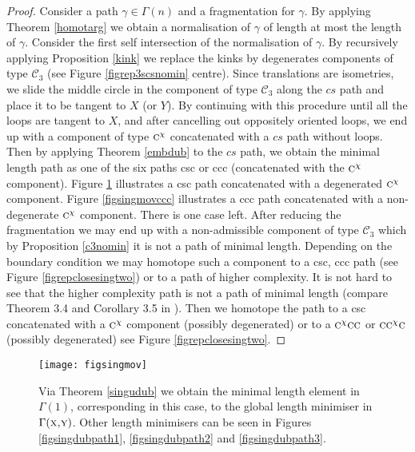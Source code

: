 \documentclass{amsart}
\theoremstyle{definition}
\theoremstyle{remark}
\numberwithin{equation}{section}
\begin{document}
\begin{proof} Consider a path $\gamma \in \Gamma(n)$ and a fragmentation for $\gamma$. By applying Theorem \ref{homotarg} we obtain a normalisation of $\gamma$ of length at most the length of $\gamma$. Consider the first self intersection of the normalisation of $\gamma$. By recursively applying Proposition \ref{kink} we replace the kinks by degenerates components of type ${\mathscr C}_3$ (see Figure \ref{figrep3scsnomin} centre). Since translations are isometries, we slide the middle circle in the component of type ${\mathscr C}_3$ along the $cs$ path and place it to be tangent to $X$ (or $Y$). By continuing with this procedure until all the loops are tangent to $X$, and after cancelling out oppositely oriented loops, we end up with a component of type $\mbox{\sc c}^{\chi}$ concatenated with a $cs$ path without loops. Then by applying Theorem \ref{embdub} to the $cs$ path, we obtain the minimal length path as one of the six paths {\sc csc} or {\sc ccc} (concatenated with the $\mbox{\sc c}^{\chi}$ component). Figure \ref{figsingmov} illustrates a {\sc csc} path concatenated with a degenerated $\mbox{\sc c}^{\chi}$ component. Figure \ref{figsingmovccc} illustrates a {\sc ccc} path concatenated with a non-degenerate $\mbox{\sc c}^{\chi}$ component. There is one case left. After reducing the fragmentation we may end up with a non-admissible component of type ${\mathscr C}_3$ which by Proposition \ref{c3nomin} it is not a path of minimal length. Depending on the boundary condition we may homotope such a component to a {\sc csc}, {\sc ccc} path (see Figure \ref{figrepclosesingtwo}) or to a path of higher complexity. It is not hard to see that the higher complexity path is not a path of minimal length (compare Theorem 3.4 and Corollary 3.5 in \cite{papera}). Then we homotope the path to a {\sc csc} concatenated with a $\mbox{\sc c}^{\chi}$ component (possibly degenerated) or to a $\mbox{\sc c}^\chi \mbox{\sc c}\mbox{\sc c}$ or $\mbox{\sc c} \mbox{\sc c}^{\chi}\mbox{\sc c}$ (possibly degenerated) see Figure \ref{figrepclosesingtwo}.
 \end{proof}

{ \begin{figure} [[htbp]
 \begin{center}
\texttt{[image: figsingmov]}
\end{center}
\caption{Via Theorem \ref{singudub} we obtain the minimal length element in $\Gamma(1)$, corresponding in this case, to the global length minimiser in $\Gamma(\mbox{\sc x,y})$. Other length minimisers can be seen in Figures \ref{figsingdubpath1}, \ref{figsingdubpath2} and \ref{figsingdubpath3}.}
\label{figsingmov}
\end{figure}}
\end{document}
